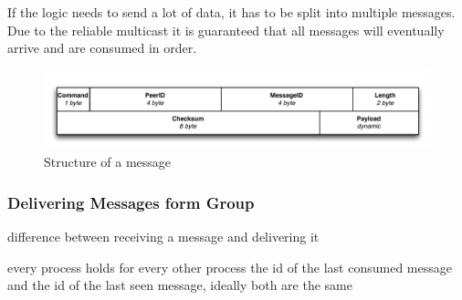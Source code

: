 If the logic needs to send a lot of data, it has to be split into multiple messages. Due to the reliable multicast it is guaranteed that all messages will eventually arrive and are consumed in order.

\begin{figure}[htbp]
    \centering
        \includegraphics[width=.9\textwidth]{figures/message.pdf}
    \caption{Structure of a message}
    \label{fig:messages}
\end{figure}

\subsubsection{Delivering Messages form Group}

difference between receiving a message and delivering it

every process holds for every other process the id of the last consumed message and the id of the last seen message, ideally both are the same 

